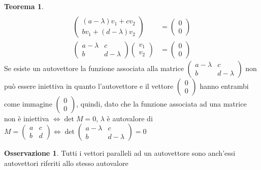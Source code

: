 \documentclass[10pt,a4paper]{article}
\theoremstyle{plain}
\theoremstyle{definition}
\newtheorem{teorema}[subsection]{Teorema}
\newtheorem{osservazione}[subsection]{Osservazione}
\begin{document}
\begin{teorema}
\begin{align*}
	\\
	\begin{pmatrix}
	(a-\lambda)v_1 + cv_2 \\ bv_1 + (d-\lambda)v_2
	\end{pmatrix}
	&=
	\begin{pmatrix}
		0  \\ 0
	\end{pmatrix}
	\\
	\begin{pmatrix}
		a-\lambda & c \\ b & d-\lambda
	\end{pmatrix}
	\begin{pmatrix}
		v_1 \\ v_2
	\end{pmatrix}
	&=
	\begin{pmatrix}
		0 \\ 0
	\end{pmatrix}
\end{align*}
Se esiste un autovettore la funzione associata alla matrice $\begin{pmatrix}
a-\lambda & c \\ b & d-\lambda
\end{pmatrix}$ non può essere iniettiva in quanto l'autovettore e il vettore $\begin{pmatrix}
	0 \\ 0
\end{pmatrix}$ hanno entrambi come immagine $\begin{pmatrix}
	0 \\ 0
\end{pmatrix}$, quindi, dato che la funzione associata ad una matrice non è iniettiva $\Leftrightarrow \det{M}=0$, $\lambda$ è autovalore di $M = \begin{pmatrix}
	a & c \\ b & d
\end{pmatrix} \Leftrightarrow \det{\begin{pmatrix}
	a-\lambda & c \\ b & d-\lambda
\end{pmatrix}}=0$ 
\end{teorema}
\newpage
\begin{osservazione}
	Tutti i vettori paralleli ad un autovettore sono anch'essi autovettori riferiti allo stesso autovalore
\end{osservazione}
\end{document}
